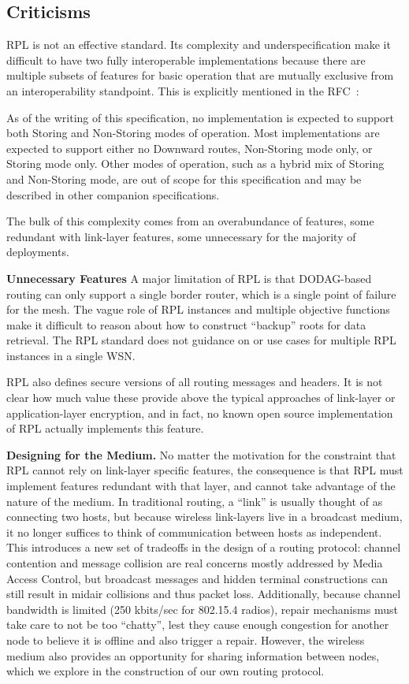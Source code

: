 \subsection{Criticisms}

RPL is not an effective standard.
Its complexity and underspecification make it difficult to have two fully interoperable implementations because there are multiple subsets of features for basic operation that are mutually exclusive from an interoperability standpoint.
This is explicitly mentioned in the RFC~\cite{rfc6550}:

\begin{displayquote}
As of the writing of this specification, no implementation is expected to support both Storing and Non-Storing modes of operation.
Most implementations are expected to support either no Downward routes, Non-Storing mode only, or Storing mode only.
Other modes of operation, such as a hybrid mix of Storing and Non-Storing mode, are out of scope for this specification and may be described in other companion specifications.
\end{displayquote}

The bulk of this complexity comes from an overabundance of features, some redundant with link-layer features, some unnecessary for the majority of deployments.

\textbf{Unnecessary Features} A major limitation of RPL is that DODAG-based routing can only support a single border router, which is a single point of failure for the mesh.
The vague role of RPL instances and multiple objective functions make it difficult to reason about how to construct ``backup'' roots for data retrieval.
The RPL standard does not guidance on or use cases for multiple RPL instances in a single WSN.

RPL also defines secure versions of all routing messages and headers.
It is not clear how much value these provide above the typical approaches of link-layer or application-layer encryption, and in fact, no known open source implementation of RPL actually implements this feature.

\textbf{Designing for the Medium.} No matter the motivation for the constraint that RPL cannot rely on link-layer specific features, the consequence is that RPL must implement features redundant with that layer, and cannot take advantage of the nature of the medium.
In traditional routing, a ``link'' is usually thought of as connecting two hosts, but because wireless link-layers live in a broadcast medium, it no longer suffices to think of communication between hosts as independent.
This introduces a new set of tradeoffs in the design of a routing protocol: channel contention and message collision are real concerns mostly addressed by Media Access Control, but broadcast messages and hidden terminal constructions can still result in midair collisions and thus packet loss.
Additionally, because channel bandwidth is limited (250 kbits/sec for 802.15.4 radios), repair mechanisms must take care to not be too ``chatty'', lest they cause enough congestion for another node to believe it is offline and also trigger a repair.
However, the wireless medium also provides an opportunity for sharing information between nodes, which we explore in the construction of our own routing protocol.


